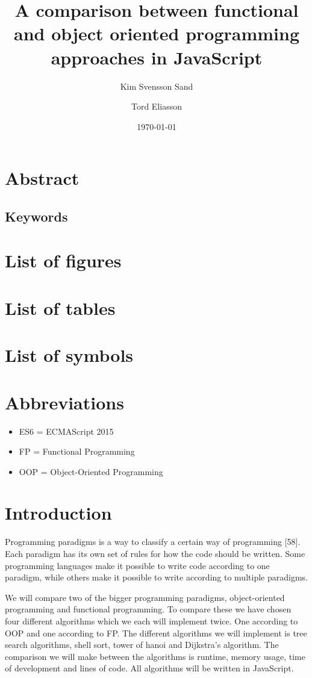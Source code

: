 \documentclass {article}
\title{A comparison between functional and object oriented programming approaches in JavaScript}
\date{\today}
\author{
Kim Svensson Sand \and Tord Eliasson
}
\begin{document}
\maketitle
{}
\newpage
\tableofcontents
\newpage
{}
\section{Abstract}
\subsection{Keywords}
\section{List of figures}
\section{List of tables}
\section{List of symbols}
\section{Abbreviations}
\begin{itemize}[leftmargin=*]
\item [ ] ES6 = ECMAScript 2015
\item [ ] FP = Functional Programming
\item [ ] OOP = Object-Oriented Programming
\end{itemize}

\section{Introduction}
Programming paradigms is a way to classify a certain way of programming [58]. Each paradigm has its own set of rules for how the code should be written. Some programming languages make it possible to write code according to one paradigm,  while others make it possible to write according to multiple paradigms. 

We will compare two of the bigger programming paradigms, object-oriented programming and functional programming. To compare these we have chosen four different algorithms which we each will implement twice. One according to OOP and one according to FP. The different algorithms we will implement is tree search algorithms, shell sort, tower of hanoi and Dijkstra's algorithm. The comparison we will make between the algorithms is runtime, memory usage, time of development and lines of code. All algorithms will be written in JavaScript.
\end{document}
